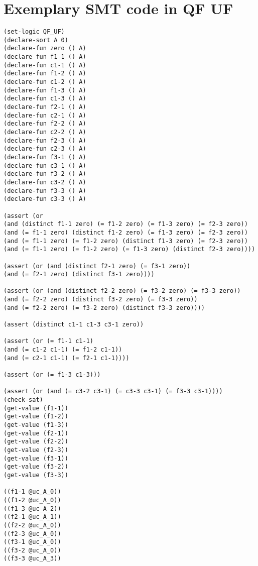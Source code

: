 \chapter{Exemplary SMT code in QF UF}
\begin{lstlisting}
(set-logic QF_UF)
(declare-sort A 0)
(declare-fun zero () A)
(declare-fun f1-1 () A)
(declare-fun c1-1 () A)
(declare-fun f1-2 () A)
(declare-fun c1-2 () A)
(declare-fun f1-3 () A)
(declare-fun c1-3 () A)
(declare-fun f2-1 () A)
(declare-fun c2-1 () A)
(declare-fun f2-2 () A)
(declare-fun c2-2 () A)
(declare-fun f2-3 () A)
(declare-fun c2-3 () A)
(declare-fun f3-1 () A)
(declare-fun c3-1 () A)
(declare-fun f3-2 () A)
(declare-fun c3-2 () A)
(declare-fun f3-3 () A)
(declare-fun c3-3 () A)

(assert (or 
(and (distinct f1-1 zero) (= f1-2 zero) (= f1-3 zero) (= f2-3 zero)) 
(and (= f1-1 zero) (distinct f1-2 zero) (= f1-3 zero) (= f2-3 zero)) 
(and (= f1-1 zero) (= f1-2 zero) (distinct f1-3 zero) (= f2-3 zero)) 
(and (= f1-1 zero) (= f1-2 zero) (= f1-3 zero) (distinct f2-3 zero))))

(assert (or (and (distinct f2-1 zero) (= f3-1 zero)) 
(and (= f2-1 zero) (distinct f3-1 zero))))

(assert (or (and (distinct f2-2 zero) (= f3-2 zero) (= f3-3 zero)) 
(and (= f2-2 zero) (distinct f3-2 zero) (= f3-3 zero)) 
(and (= f2-2 zero) (= f3-2 zero) (distinct f3-3 zero))))

(assert (distinct c1-1 c1-3 c3-1 zero))

(assert (or (= f1-1 c1-1) 
(and (= c1-2 c1-1) (= f1-2 c1-1)) 
(and (= c2-1 c1-1) (= f2-1 c1-1))))

(assert (or (= f1-3 c1-3)))

(assert (or (and (= c3-2 c3-1) (= c3-3 c3-1) (= f3-3 c3-1))))
(check-sat)
(get-value (f1-1))
(get-value (f1-2))
(get-value (f1-3))
(get-value (f2-1))
(get-value (f2-2))
(get-value (f2-3))
(get-value (f3-1))
(get-value (f3-2))
(get-value (f3-3))

((f1-1 @uc_A_0))
((f1-2 @uc_A_0))
((f1-3 @uc_A_2))
((f2-1 @uc_A_1))
((f2-2 @uc_A_0))
((f2-3 @uc_A_0))
((f3-1 @uc_A_0))
((f3-2 @uc_A_0))
((f3-3 @uc_A_3))
\end{lstlisting}